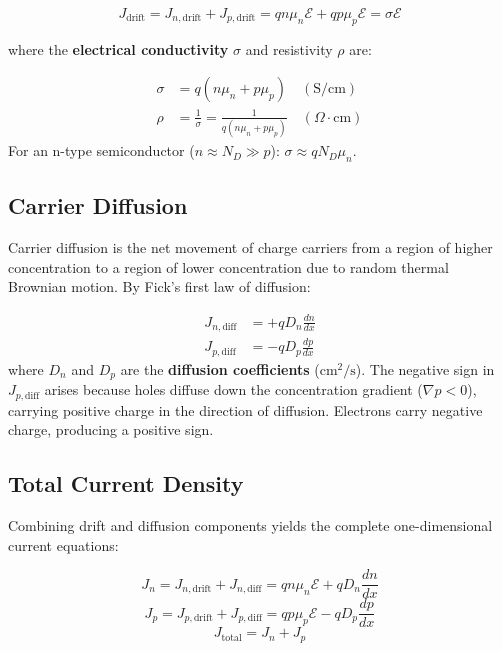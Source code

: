 \documentclass[12pt,a4paper]{article}
\begin{document}
\begin{equation}
  J_{\text{drift}} = J_{n,\text{drift}} + J_{p,\text{drift}} = q n \mu_n \mathcal{E} + q p \mu_p \mathcal{E} = \sigma \mathcal{E}
\end{equation}

where the \textbf{electrical conductivity} $\sigma$ and resistivity $\rho$ are:

\begin{tcolorbox}[formulabox, title={\textbf{Conductivity and Resistivity}}]
\begin{align}
  \sigma &= q (n \mu_n + p \mu_p) \quad (\text{S/cm}) \\
  \rho &= \frac{1}{\sigma} = \frac{1}{q (n \mu_n + p \mu_p)} \quad (\Omega\cdot\text{cm})
\end{align}
For an n-type semiconductor ($n \approx N_D \gg p$): $\sigma \approx q N_D \mu_n$.
\end{tcolorbox}

\subsection{Carrier Diffusion}
Carrier diffusion is the net movement of charge carriers from a region of higher concentration to a region of lower concentration due to random thermal Brownian motion. By Fick's first law of diffusion:

\begin{tcolorbox}[formulabox, title={\textbf{Diffusion Current Densities}}]
\begin{align}
  J_{n,\text{diff}} &= +q D_n \frac{dn}{dx} \\
  J_{p,\text{diff}} &= -q D_p \frac{dp}{dx}
\end{align}
where $D_n$ and $D_p$ are the \textbf{diffusion coefficients} ($\text{cm}^2/\text{s}$). The negative sign in $J_{p,\text{diff}}$ arises because holes diffuse down the concentration gradient ($\nabla p < 0$), carrying positive charge in the direction of diffusion. Electrons carry negative charge, producing a positive sign.
\end{tcolorbox}

\subsection{Total Current Density}
Combining drift and diffusion components yields the complete one-dimensional current equations:

\begin{equation}
  J_n = J_{n,\text{drift}} + J_{n,\text{diff}} = q n \mu_n \mathcal{E} + q D_n \frac{dn}{dx}
\end{equation}
\begin{equation}
  J_p = J_{p,\text{drift}} + J_{p,\text{diff}} = q p \mu_p \mathcal{E} - q D_p \frac{dp}{dx}
\end{equation}
\begin{equation}
  J_{\text{total}} = J_n + J_p
\end{equation}
\end{document}
